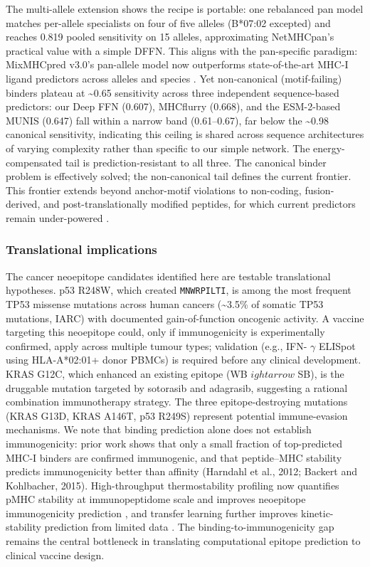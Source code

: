 \documentclass[10pt]{article}
\begin{document}
The multi-allele extension shows the recipe is portable: one rebalanced
pan model matches per-allele specialists on four of five alleles
(B*07:02 excepted) and reaches 0.819 pooled sensitivity on 15 alleles,
approximating NetMHCpan's practical value with a simple DFFN. This
aligns with the pan-specific paradigm: MixMHCpred v3.0's pan-allele
model now outperforms state-of-the-art MHC-I ligand predictors across
alleles and species \cite{Tadros25}. Yet non-canonical
(motif-failing) binders plateau at \textasciitilde0.65 sensitivity
across three independent sequence-based predictors: our Deep FFN
(0.607), MHCflurry (0.668), and the ESM-2-based MUNIS (0.647) fall
within a narrow band (0.61--0.67), far below the \textasciitilde0.98
canonical sensitivity, indicating this ceiling is shared across sequence
architectures of varying complexity rather than specific to our simple
network. The energy-compensated tail is prediction-resistant to all
three. The canonical binder problem is effectively solved; the
non-canonical tail defines the current frontier. This frontier extends
beyond anchor-motif violations to non-coding, fusion-derived, and
post-translationally modified peptides, for which current predictors
remain under-powered \cite{Vo25}.

\subsubsection{Translational
implications}\label{translational-implications}

The cancer neoepitope candidates identified here are testable
translational hypotheses. p53 R248W, which created \texttt{MNWRPILTI},
is among the most frequent TP53 missense mutations across human cancers
(\textasciitilde3.5\% of somatic TP53 mutations, IARC) with documented
gain-of-function oncogenic activity. A vaccine targeting this neoepitope
could, only if immunogenicity is experimentally confirmed, apply across
multiple tumour types; validation (e.g., IFN- $\gamma$  ELISpot using
HLA-A*02:01+ donor PBMCs) is required before any clinical development.
KRAS G12C, which enhanced an existing epitope (WB $
ightarrow$ SB), is the druggable
mutation targeted by sotorasib and adagrasib, suggesting a rational
combination immunotherapy strategy. The three epitope-destroying
mutations (KRAS G13D, KRAS A146T, p53 R249S) represent potential
immune-evasion mechanisms. We note that binding prediction alone does
not establish immunogenicity: prior work shows that only a small
fraction of top-predicted MHC-I binders are confirmed immunogenic, and
that peptide--MHC stability predicts immunogenicity better than affinity
(Harndahl et al., 2012; Backert and Kohlbacher, 2015). High-throughput
thermostability profiling now quantifies pMHC stability at
immunopeptidome scale and improves neoepitope immunogenicity prediction
\cite{Jappe20}, and transfer learning further improves
kinetic-stability prediction from limited data \cite{Fasoulis24}.
The binding-to-immunogenicity gap remains the central bottleneck in
translating computational epitope prediction to clinical vaccine design.
\end{document}

